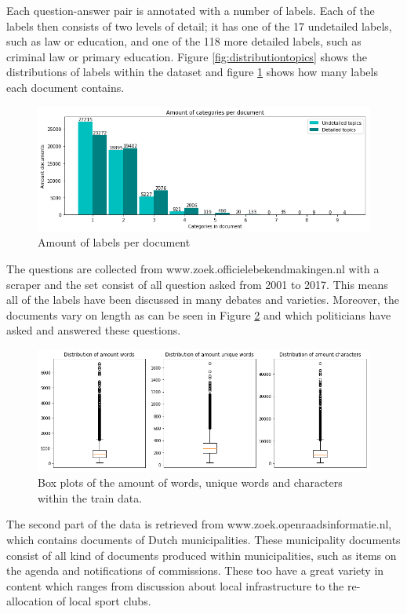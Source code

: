 Each question-answer pair is annotated with a number of labels. Each of the labels then consists of two levels of detail; it has one of the 17 undetailed labels, such as law or education, and one of the 118 more detailed labels, such as criminal law or primary education. Figure \ref{fig:distributiontopics} shows the distributions of labels within the dataset and figure \ref{fig:LabelAmount} shows how many labels each document contains.\\

\begin{figure}[H]
	\centering
  	\includegraphics[width=.9\linewidth]{TrainAmountLabels}
  	\caption{Amount of labels per document}
  	\label{fig:LabelAmount}
\end{figure}

The questions are collected from www.zoek.officielebekendmakingen.nl with a scraper and the set consist of all question asked from 2001 to 2017. This means all of the labels have been discussed in many debates and varieties. Moreover, the documents vary on length as can be seen in Figure \ref{fig:WordAmount} and which politicians have asked and answered these questions.\\

\begin{figure}[H]
	\centering
  	\includegraphics[width=.9\linewidth]{TrainAmountWords}
  	\caption{Box plots of the amount of words, unique words and characters within the train data.}
  	\label{fig:WordAmount}
\end{figure}

The second part of the data is retrieved from www.zoek.openraadsinformatie.nl, which contains documents of Dutch municipalities. These municipality documents consist of all kind of documents produced within municipalities, such as items on the agenda and notifications of commissions. These too have a great variety in content which ranges from discussion about local infrastructure to the re-allocation of local sport clubs. \\

